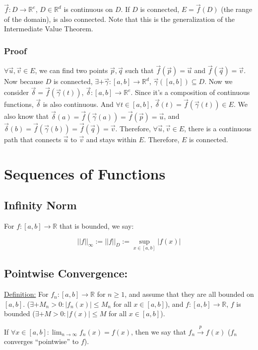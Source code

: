 \documentclass[11 pt, twoside]{article}
\begin{document}
$\vec{f}: D \to \mathbb{R}^e$, $D \in \mathbb{R}^d$ is continuous on $D$.
If $D$ is connected, $E = \vec{f}(D)$ (the range of the domain), is also
connected. Note that this is the generalization of the Intermediate Value
Theorem.

\subsubsection{Proof}

$\forall \vec{u}, \vec{v} \in E$, we can find two points $\vec{p}, \vec{q}$ such
that $\vec{f}(\vec{p}) = \vec{u}$ and $\vec{f}(\vec{q}) = \vec{v}$. Now because
$D$ is connected, $\exists+ \vec{\gamma}: [a, b] \to \mathbb{R}^d$,
$\vec{\gamma}([a, b]) \subseteq D$. Now we consider $\vec{\delta} =
\vec{f}(\vec{\gamma}(t))$, $\vec{\delta} : [a, b] \to \mathbb{R}^e$. Since
it's a composition of continuous functions, $\vec{\delta}$ is also continuous.
And $\forall t \in [a, b]$, $\vec{\delta}(t) = \vec{f}(\vec{\gamma}(t)) \in E$.
We also know that $\vec{\delta}(a) = \vec{f}(\vec{\gamma}(a)) = \vec{f}(\vec{p})
= \vec{u}$, and $\vec{\delta}(b) = \vec{f}(\vec{\gamma}(b)) = \vec{f}(\vec{q})
= \vec{v}$. Therefore, $\forall \vec{u}, \vec{v} \in E$, there is a
continuous path that connects $\vec{u}$ to $\vec{v}$ and stays within $E$.
Therefore, $E$ is connected.

\section{Sequences of Functions}
\subsection{Infinity Norm}
For $f: [a,b] \to \mathbb{R}$ that is bounded, we say:

$$||f||_\infty := ||f||_D := \sup_{x\in[a,b]} |f(x)|$$

\subsection{Pointwise Convergence:}

\underline{Definition:}
For $f_n : [a,b] \to \mathbb{R}$ for $n \geq 1$, and assume that they are all bounded on $[a,b]$. ($\exists+ M_n > 0 : |f_n(x)| \leq M_n$ for all $x \in [a,b]$), and $f:[a,b] \to \mathbb{R}$, $f$ is bounded ($\exists+ M > 0: |f(x)| \leq M$ for all $x \in [a,b]$).

If $\forall x \in [a,b]: \lim_{n\to\infty} f_n(x) = f(x)$, then we say that $f_n \overset{p}{\to} f(x)$ ($f_n$ converges ``pointwise'' to $f$).
\end{document}
